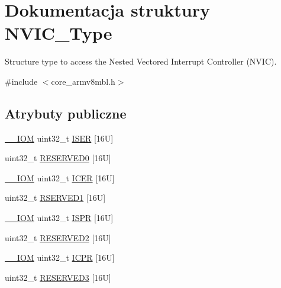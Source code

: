 \hypertarget{struct_n_v_i_c___type}{}\section{Dokumentacja struktury N\+V\+I\+C\+\_\+\+Type}
\label{struct_n_v_i_c___type}


Structure type to access the Nested Vectored Interrupt Controller (N\+V\+IC).  




{\ttfamily \#include $<$core\+\_\+armv8mbl.\+h$>$}

\subsection*{Atrybuty publiczne}
\begin{DoxyCompactItemize}
\item 
\hyperlink{core__sc300_8h_ab6caba5853a60a17e8e04499b52bf691}{\+\_\+\+\_\+\+I\+OM} uint32\+\_\+t \hyperlink{struct_n_v_i_c___type_a06726c729c5557701defc4d6b5d8f9f6}{I\+S\+ER} \mbox{[}16\+U\mbox{]}
\item 
uint32\+\_\+t \hyperlink{struct_n_v_i_c___type_a114b23ee6f1540603908adaedaecc477}{R\+E\+S\+E\+R\+V\+E\+D0} \mbox{[}16\+U\mbox{]}
\item 
\hyperlink{core__sc300_8h_ab6caba5853a60a17e8e04499b52bf691}{\+\_\+\+\_\+\+I\+OM} uint32\+\_\+t \hyperlink{struct_n_v_i_c___type_aed882e10ea8ee6a915007af71643d7da}{I\+C\+ER} \mbox{[}16\+U\mbox{]}
\item 
uint32\+\_\+t \hyperlink{struct_n_v_i_c___type_adb1d396e2b2209db1e9a45dd2ed27ca3}{R\+S\+E\+R\+V\+E\+D1} \mbox{[}16\+U\mbox{]}
\item 
\hyperlink{core__sc300_8h_ab6caba5853a60a17e8e04499b52bf691}{\+\_\+\+\_\+\+I\+OM} uint32\+\_\+t \hyperlink{struct_n_v_i_c___type_a288bc5e8b844a531a6ecdcc8dbcb8050}{I\+S\+PR} \mbox{[}16\+U\mbox{]}
\item 
uint32\+\_\+t \hyperlink{struct_n_v_i_c___type_a8ed6bf06e09e4ebc57e591fde22c70c3}{R\+E\+S\+E\+R\+V\+E\+D2} \mbox{[}16\+U\mbox{]}
\item 
\hyperlink{core__sc300_8h_ab6caba5853a60a17e8e04499b52bf691}{\+\_\+\+\_\+\+I\+OM} uint32\+\_\+t \hyperlink{struct_n_v_i_c___type_aa056e3f59e88845ee47db4a43635b3a2}{I\+C\+PR} \mbox{[}16\+U\mbox{]}
\item 
uint32\+\_\+t \hyperlink{struct_n_v_i_c___type_a33fe3d6f15f4d638ac6a10a370e6f8ed}{R\+E\+S\+E\+R\+V\+E\+D3} \mbox{[}16\+U\mbox{]}
\item 

\end{DoxyCompactItemize}

